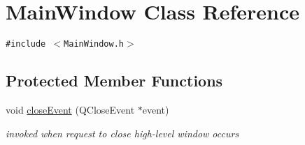 \hypertarget{classMainWindow}{
\section{MainWindow Class Reference}
\label{classMainWindow}
}
{\tt \#include $<$MainWindow.h$>$}

\subsection*{Protected Member Functions}
\begin{CompactItemize}
\item 
\hypertarget{classMainWindow_4e20a4a065fbb0e4d3532a45a0a91425}{
void \hyperlink{classMainWindow_4e20a4a065fbb0e4d3532a45a0a91425}{closeEvent} (QCloseEvent $\ast$event)}
\label{classMainWindow_4e20a4a065fbb0e4d3532a45a0a91425}

\begin{CompactList}\small\item\em invoked when request to close high-level window occurs \item\end{CompactList}\end{CompactItemize}
